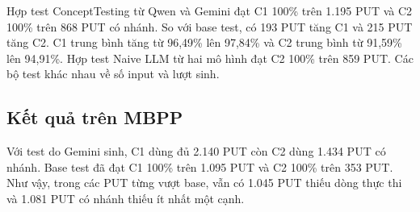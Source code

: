 Hợp test ConceptTesting từ Qwen và Gemini đạt C1 100\% trên 1.195 PUT và C2 100\% trên 868 PUT có nhánh. So với base test, có 193 PUT tăng C1 và 215 PUT tăng C2. C1 trung bình tăng từ 96,49\% lên 97,84\% và C2 trung bình từ 91,59\% lên 94,91\%. Hợp test Naive LLM từ hai mô hình đạt C2 100\% trên 859 PUT. Các bộ test khác nhau về số input và lượt sinh.

\subsection{Kết quả trên MBPP}

Với test do Gemini sinh, C1 dùng đủ 2.140 PUT còn C2 dùng 1.434 PUT có nhánh. Base test đã đạt C1 100\% trên 1.095 PUT và C2 100\% trên 353 PUT. Như vậy, trong các PUT từng vượt base, vẫn có 1.045 PUT thiếu dòng thực thi và 1.081 PUT có nhánh thiếu ít nhất một cạnh.

